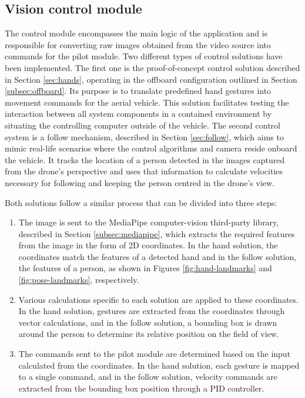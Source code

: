 \subsection{Vision control module}
\label{subsec:control-module}

The control module encompasses the main logic of the application and is responsible for converting raw images obtained from the video source into commands for the pilot module. Two different types of control solutions have been implemented. The first one is the proof-of-concept control solution described in Section \ref{sec:hands}, operating in the offboard configuration outlined in Section \ref{subsec:offboard}. Its purpose is to translate predefined hand gestures into movement commands for the aerial vehicle. This solution facilitates testing the interaction between all system components in a contained environment by situating the controlling computer outside of the vehicle. The second control system is a follow mechanism, described in Section \ref{sec:follow}, which aims to mimic real-life scenarios where the control algorithms and camera reside onboard the vehicle. It tracks the location of a person detected in the images captured from the drone's perspective and uses that information to calculate velocities necessary for following and keeping the person centred in the drone's view.

Both solutions follow a similar process that can be divided into three steps:
\begin{enumerate}
    \item The image is sent to the MediaPipe computer-vision third-party library, described in Section \ref{subsec:mediapipe}, which extracts the required features from the image in the form of 2D coordinates. In the hand solution, the coordinates match the features of a detected hand and in the follow solution, the features of a person, as shown in Figures \ref{fig:hand-landmarks} and \ref{fig:pose-landmarks}, respectively.
    \item Various calculations specific to each solution are applied to these coordinates. In the hand solution, gestures are extracted from the coordinates through vector calculations, and in the follow solution, a bounding box is drawn around the person to determine its relative position on the field of view.
    \item The commands sent to the pilot module are determined based on the input calculated from the coordinates. In the hand solution, each gesture is mapped to a single command, and in the follow solution, velocity commands are extracted from the bounding box position through a PID controller.
\end{enumerate}

